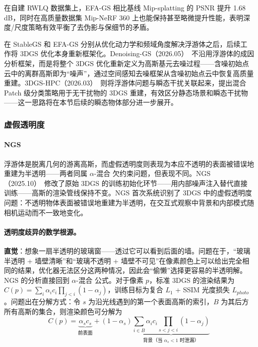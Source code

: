 在自建 RWLQ 数据集上，EFA-GS 相比基线 Mip-splatting 的 PSNR 提升 1.68 dB，同时在高质量数据集 Mip-NeRF 360 上也能保持甚至略微提升性能，表明深度/尺度策略有效平衡了去伪影与保细节的矛盾。

在 StableGS 和 EFA-GS 分别从优化动力学和频域角度解决浮游体之后，后续工作将 3DGS 优化本身重新框架化。Denoising-GS（2026.05）~\cite{2605_14880}不沿用浮游体的成因分析框架，而是将整个 3DGS 优化重新定义为高斯基元去噪过程——含噪初始点云中的离群高斯即为``噪声''，通过空间感知去噪框架从含噪初始点云中恢复高质量重建。3DGS-HPC（2026.03）~\cite{2603_07587}则将浮游体问题与瞬态干扰关联起来，提出混合 Patch 级分类策略用于无干扰物的 3DGS 重建，有效区分静态场景和瞬态干扰物——这一思路将在本节后续的瞬态物体部分进一步展开。

\subsubsection{虚假透明度}

\paragraph{NGS}
浮游体是脱离几何的游离高斯，而虚假透明度则表现为本应不透明的表面被错误地重建为半透明——两者同属 $\alpha$-混合 欠约束问题，但表现不同。NGS（2025.10）~\cite{2510_15736}修改了原始 3DGS 的训练初始化环节——用内部噪声注入替代直接训练——高斯的渲染管线保持不变。NGS 首次系统识别了 3DGS 中的虚假透明度问题：不透明物体表面被错误地重建为半透明，在交互式观察中背景和内部模式随相机运动而不一致地变化。

\paragraph{透明度歧异的数学根源。}\textbf{直觉}：想象一扇半透明的玻璃窗——透过它可以看到后面的墙。问题在于，``玻璃半透明 + 墙壁清晰''和``玻璃不透明 + 墙壁不可见''在像素颜色上可以给出完全相同的结果，优化器无法区分这两种情况，因此会``偷懒''选择更容易的半透明解。NGS 的分析直接回到 $\alpha$-混合 公式。对于像素 $p$，标准 3DGS 的渲染结果为 $C(p) = \sum_i \alpha_i c_i \prod_{j<i}(1-\alpha_j)$，训练目标为复合 $L_1$ + SSIM 光度损失 $L_{photo}$。问题出在分解方式：令 $s$ 为沿光线遇到的第一个表面高斯的索引，$B$ 为其后方所有高斯的集合，则渲染颜色可分解为
\begin{equation*}
C(p) = \underbrace{\alpha_s c_s}_{\text{前表面}} + (1-\alpha_s) \underbrace{\sum_{i \in B} \alpha_i c_i \prod_{s<j<i}(1-\alpha_j)}_{\text{背景（当 $\alpha_s < 1$ 时泄漏）}}
\end{equation*}

